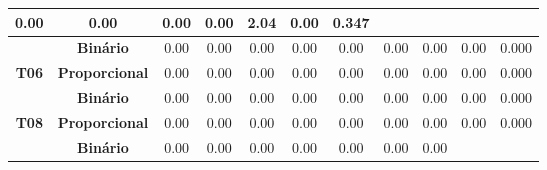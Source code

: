 \begin{table}[htbp]
\begin{tabular}{|c|cccccccccc|}
		\multicolumn{1}{c|}{\cellcolor[HTML]{F2F2F2}0.00} &
		\multicolumn{1}{c|}{\cellcolor[HTML]{F2F2F2}0.00} &
		\multicolumn{1}{c|}{\cellcolor[HTML]{F2F2F2}0.00} &
		\multicolumn{1}{c|}{\cellcolor[HTML]{F2F2F2}0.00} &
		\multicolumn{1}{c|}{\cellcolor[HTML]{F2F2F2}2.04} &
		\multicolumn{1}{c|}{\cellcolor[HTML]{F2F2F2}0.00} &
		\cellcolor[HTML]{F2F2F2}0.347 \\ \hline
		&
		\multicolumn{1}{c|}{\textbf{Binário}} &
		\multicolumn{1}{c|}{0.00} &
		\multicolumn{1}{c|}{0.00} &
		\multicolumn{1}{c|}{0.00} &
		\multicolumn{1}{c|}{0.00} &
		\multicolumn{1}{c|}{0.00} &
		\multicolumn{1}{c|}{0.00} &
		\multicolumn{1}{c|}{0.00} &
		\multicolumn{1}{c|}{0.00} &
		0.000 \\ \cline{2-11} 
		\multirow{-2}{*}{\textbf{T06}} &
		\multicolumn{1}{c|}{\cellcolor[HTML]{F2F2F2}\textbf{Proporcional}} &
		\multicolumn{1}{c|}{\cellcolor[HTML]{F2F2F2}0.00} &
		\multicolumn{1}{c|}{\cellcolor[HTML]{F2F2F2}0.00} &
		\multicolumn{1}{c|}{\cellcolor[HTML]{F2F2F2}0.00} &
		\multicolumn{1}{c|}{\cellcolor[HTML]{F2F2F2}0.00} &
		\multicolumn{1}{c|}{\cellcolor[HTML]{F2F2F2}0.00} &
		\multicolumn{1}{c|}{\cellcolor[HTML]{F2F2F2}0.00} &
		\multicolumn{1}{c|}{\cellcolor[HTML]{F2F2F2}0.00} &
		\multicolumn{1}{c|}{\cellcolor[HTML]{F2F2F2}0.00} &
		\cellcolor[HTML]{F2F2F2}0.000 \\ \hline
		&
		\multicolumn{1}{c|}{\textbf{Binário}} &
		\multicolumn{1}{c|}{0.00} &
		\multicolumn{1}{c|}{0.00} &
		\multicolumn{1}{c|}{0.00} &
		\multicolumn{1}{c|}{0.00} &
		\multicolumn{1}{c|}{0.00} &
		\multicolumn{1}{c|}{0.00} &
		\multicolumn{1}{c|}{0.00} &
		\multicolumn{1}{c|}{0.00} &
		0.000 \\ \cline{2-11} 
		\multirow{-2}{*}{\textbf{T08}} &
		\multicolumn{1}{c|}{\cellcolor[HTML]{F2F2F2}\textbf{Proporcional}} &
		\multicolumn{1}{c|}{\cellcolor[HTML]{F2F2F2}0.00} &
		\multicolumn{1}{c|}{\cellcolor[HTML]{F2F2F2}0.00} &
		\multicolumn{1}{c|}{\cellcolor[HTML]{F2F2F2}0.00} &
		\multicolumn{1}{c|}{\cellcolor[HTML]{F2F2F2}0.00} &
		\multicolumn{1}{c|}{\cellcolor[HTML]{F2F2F2}0.00} &
		\multicolumn{1}{c|}{\cellcolor[HTML]{F2F2F2}0.00} &
		\multicolumn{1}{c|}{\cellcolor[HTML]{F2F2F2}0.00} &
		\multicolumn{1}{c|}{\cellcolor[HTML]{F2F2F2}0.00} &
		\cellcolor[HTML]{F2F2F2}0.000 \\ \hline
		&
		\multicolumn{1}{c|}{\textbf{Binário}} &
		\multicolumn{1}{c|}{0.00} &
		\multicolumn{1}{c|}{0.00} &
		\multicolumn{1}{c|}{0.00} &
		\multicolumn{1}{c|}{0.00} &
		\multicolumn{1}{c|}{0.00} &
		\multicolumn{1}{c|}{0.00} &
		\multicolumn{1}{c|}{0.00} &

\end{tabular}
\end{table}
